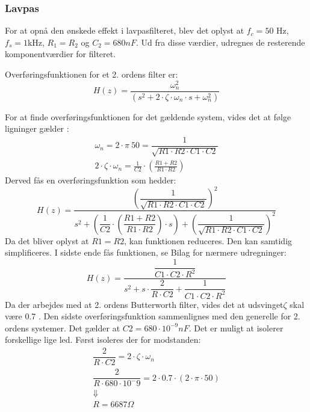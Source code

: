 \subsubsection{Lavpas}
For at opnå den ønskede effekt i lavpasfilteret, blev det oplyst at $ f_c=50$ Hz, $ f_s = 1$kHz, $ R_1 = R_2 $ og $ C_2=680 nF$. Ud fra disse værdier, udregnes de resterende komponentværdier for filteret.

Overføringsfunktionen for et 2. ordens filter er: 
\begin{equation}
H(z)=\frac{\omega_n^2}{(s^2 + 2\cdot\zeta \cdot \omega_n \cdot s+\omega_n^2)}
\end{equation}

For at finde overføringsfunktionen for det gældende system, vides det at følge ligninger gælder \cite{Wikilavpas}: 
\begin{equation}
\begin{split}
\omega_n = 2\cdot \pi\ 50 = \dfrac{1}{\sqrt{R1\cdot R2\cdot C1\cdot C2}}\\
2\cdot \zeta\cdot\omega_n =\frac{1}{C2}\cdot \left( \frac{R1+R2}{R1\cdot R2}\right)
\end{split}
\end{equation}
Derved fås en overføringsfunktion som hedder: 
\begin{equation}
H(z)=\frac{\left(\dfrac{1}{\sqrt{R1\cdot R2 \cdot C1\cdot C2}}\right)^2}{s^2+ \left( \dfrac{1}{C2} \cdot \left( \dfrac{R1+R2}{R1\cdot R2}\right) \cdot s \right) +\left( \dfrac{1}{\sqrt{R1\cdot R2 \cdot C1\cdot C2}}\right)^2 }
\end{equation}
Da det bliver oplyst at $ R1=R2 $, kan funktionen reduceres. Den kan samtidig simplificeres. I sidste ende fås funktionen, se Bilag for nærmere udregninger: 
\begin{equation}
H(z)=\dfrac{\dfrac{1}{C1 \cdot C2\cdot R^2}}{s^2+s\cdot \dfrac{2}{R\cdot C2}+ \dfrac{1}{C1\cdot C2\cdot R^2}}
\end{equation}
Da der arbejdes med at 2. ordens Butterworth filter, vides det at udsvinget$ \zeta $ skal være 0.7 \cite{ASB}. 
Den sidste overføringsfunktion sammenlignes med den generelle for 2. ordens systemer. Det gælder at $ C2 = 680\cdot 10^{-9} nF $. Det er muligt at isolerer forskellige lige led. Først isoleres der for modstanden: 
\begin{equation}
\begin{split}
\dfrac{2}{R\cdot C2}= 2\cdot \zeta \cdot \omega_n\\
\dfrac{2}{R\cdot 680\cdot 10^-9}=2\cdot 0.7 \cdot(2\cdot\pi\cdot 50)\\
\Downarrow\\
 R= 6687 \Omega
\end{split}
\end{equation}
